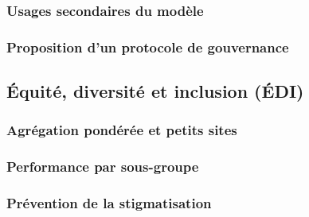 \subsubsection{Usages secondaires du modèle}
\label{sec:usages-secondaires}

\subsubsection{Proposition d'un protocole de gouvernance}
\label{sec:protocole-gouvernance}

\subsection{Équité, diversité et inclusion (ÉDI)}
\label{sec:edi}

\subsubsection{Agrégation pondérée et petits sites}
\label{sec:edi-petits-sites}

\subsubsection{Performance par sous-groupe}
\label{sec:edi-sous-groupes}

\subsubsection{Prévention de la stigmatisation}
\label{sec:edi-stigmatisation}
